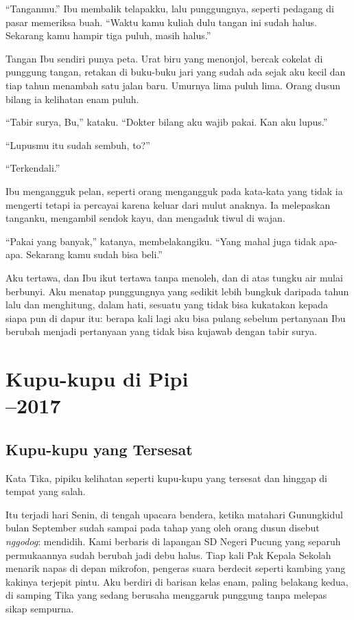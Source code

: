 \documentclass[11pt,twoside,openany]{book}
\begin{document}
``Tanganmu.'' Ibu membalik telapakku, lalu punggungnya, seperti pedagang di pasar memeriksa buah. ``Waktu kamu kuliah dulu tangan ini sudah halus. Sekarang kamu hampir tiga puluh, masih halus.''

Tangan Ibu sendiri punya peta. Urat biru yang menonjol, bercak cokelat di punggung tangan, retakan di buku-buku jari yang sudah ada sejak aku kecil dan tiap tahun menambah satu jalan baru. Umurnya lima puluh lima. Orang dusun bilang ia kelihatan enam puluh.

``Tabir surya, Bu,'' kataku. ``Dokter bilang aku wajib pakai. Kan aku lupus.''

``Lupusmu itu sudah sembuh, to?''

``Terkendali.''

Ibu mengangguk pelan, seperti orang mengangguk pada kata-kata yang tidak ia mengerti tetapi ia percayai karena keluar dari mulut anaknya. Ia melepaskan tanganku, mengambil sendok kayu, dan mengaduk tiwul di wajan.

``Pakai yang banyak,'' katanya, membelakangiku. ``Yang mahal juga tidak apa-apa. Sekarang kamu sudah bisa beli.''

Aku tertawa, dan Ibu ikut tertawa tanpa menoleh, dan di atas tungku air mulai berbunyi. Aku menatap punggungnya yang sedikit lebih bungkuk daripada tahun lalu dan menghitung, dalam hati, sesuatu yang tidak bisa kukatakan kepada siapa pun di dapur itu: berapa kali lagi aku bisa pulang sebelum pertanyaan Ibu berubah menjadi pertanyaan yang tidak bisa kujawab dengan tabir surya.

\part[Kupu-kupu di Pipi]{Kupu-kupu di Pipi\\[0.7em]\normalsize{}--2017}
\chapter{Kupu-kupu yang Tersesat}
Kata Tika, pipiku kelihatan seperti kupu-kupu yang tersesat dan hinggap di tempat yang salah.

Itu terjadi hari Senin, di tengah upacara bendera, ketika matahari Gunungkidul bulan September sudah sampai pada tahap yang oleh orang dusun disebut \emph{nggodog}: mendidih. Kami berbaris di lapangan SD Negeri Pucung yang separuh permukaannya sudah berubah jadi debu halus. Tiap kali Pak Kepala Sekolah menarik napas di depan mikrofon, pengeras suara berdecit seperti kambing yang kakinya terjepit pintu. Aku berdiri di barisan kelas enam, paling belakang kedua, di samping Tika yang sedang berusaha menggaruk punggung tanpa melepas sikap sempurna.
\end{document}
